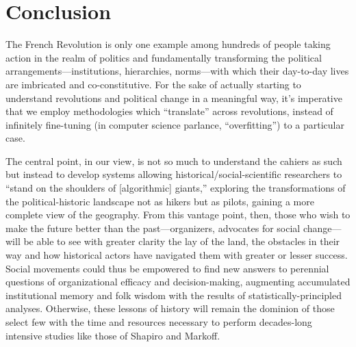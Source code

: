 \section{Conclusion}

The French Revolution is only one example among hundreds of people taking action in the realm of politics and fundamentally transforming the political arrangements---institutions, hierarchies, norms---with which their day-to-day lives are imbricated and co-constitutive. For the sake of actually starting to understand revolutions and political change in a meaningful way, it's imperative that we employ methodologies which ``translate'' across revolutions, instead of infinitely fine-tuning (in computer science parlance, ``overfitting'') to a particular case. 

The central point, in our view, is not so much to understand the cahiers as such but instead to develop systems allowing historical/social-scientific researchers to ``stand on the shoulders of [algorithmic] giants,'' exploring the transformations of the political-historic landscape not as hikers but as pilots, gaining a more complete view of the geography. From this vantage point, then, those who wish to make the future better than the past---organizers, advocates for social change---will be able to see with greater clarity the lay of the land, the obstacles in their way and how historical actors have navigated them with greater or lesser success. Social movements could thus be empowered to find new answers to perennial questions of organizational efficacy and decision-making, augmenting accumulated institutional memory and folk wisdom with the results of statistically-principled analyses. Otherwise, these lessons of history will remain the dominion of those select few with the time and resources necessary to perform decades-long intensive studies like those of Shapiro and Markoff.

